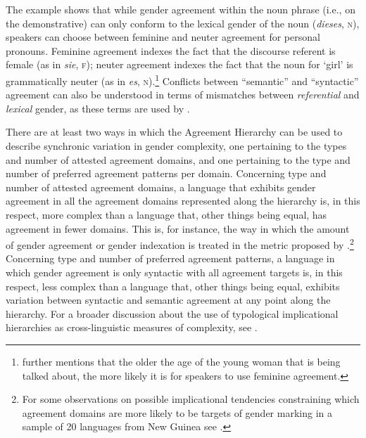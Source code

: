 \documentclass[output=collectionpaper]{langsci/langscibook}
\begin{document}
The example shows that while gender agreement within the noun phrase (i.e., on the demonstrative) can only conform to the lexical gender of the noun (\textit{dieses}, \textsc{n}), 
speakers can choose between feminine and neuter agreement for personal pronouns. 
Feminine agreement indexes the fact that the discourse referent is female (as in \textit{sie}, \textsc{f}); neuter agreement indexes the fact that the noun for `girl' is grammatically neuter (as in \textit{es}, \textsc{n}).\footnote{\citet[228]{Corbett1991} further mentions that the older the age of the young woman that is being talked about, the more likely it is for speakers to use feminine agreement.}  Conflicts between ``semantic'' and ``syntactic'' agreement can also be understood in terms of mismatches between \textit{referential} and \textit{lexical} gender, as these terms are used by \citet{Dahl2000a} \citep[see also the study of the evolution of gender marking in medieval  by][]{Siemund2011}.

There are at least two ways in which the Agreement Hierarchy can be used to describe synchronic variation in gender complexity, one pertaining to the types and number of attested agreement domains, and one pertaining to the type and number of preferred agreement patterns per domain. Concerning type and number of attested agreement domains, a language that exhibits gender agreement in all the agreement domains represented along the hierarchy is, in this respect, more complex than a language that, other things being equal, has agreement in fewer domains. This is, for instance, the way in which the amount of gender agreement or gender indexation is treated in the metric proposed by \citet{DiGarbo2016}.\footnote{For some observations on possible  implicational tendencies constraining which agreement domains are more likely to be targets of gender marking in a sample of 20 languages from New Guinea see .} Concerning type and number of preferred agreement patterns, a language in which gender agreement is only syntactic with all agreement targets is, in this respect, less complex than a language that, other things being equal, exhibits variation between syntactic and semantic agreement at any point along the hierarchy. For a broader discussion about the use of typological implicational hierarchies as cross-linguistic measures of complexity, see \citet{Miestamo2009}.
\end{document}
